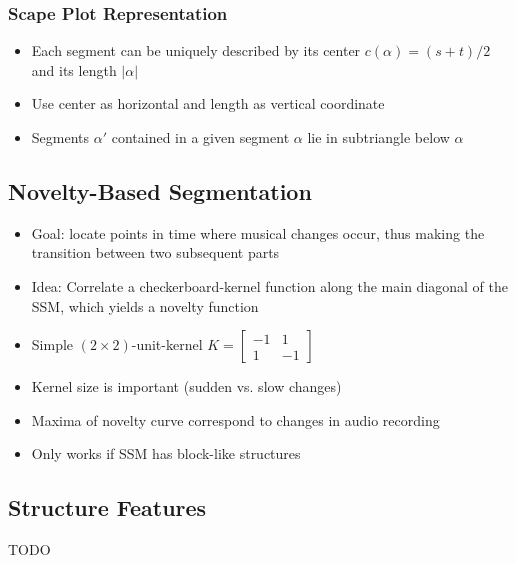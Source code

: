 \documentclass{scrartcl}
\begin{document}
\subsubsection*{Scape Plot Representation}
\begin{itemize}
    \item
        Each segment can be uniquely described by its center $c(\alpha) = (s+t)/2$ and its length $|\alpha|$
    \item
        Use center as horizontal and length as vertical coordinate
    \item
        Segments $\alpha'$ contained in a given segment $\alpha$ lie in subtriangle below $\alpha$
\end{itemize}

\subsection{Novelty-Based Segmentation}
\begin{itemize}
    \item
        Goal: locate points in time where musical changes occur, thus making the transition between two subsequent parts
    \item
        Idea: Correlate a checkerboard-kernel function along the main diagonal of the SSM, which yields a novelty function
    \item
        Simple $(2 \times 2)$-unit-kernel $K = \begin{bmatrix} -1 & 1 \\ 1 & -1 \end{bmatrix}$
    \item
        Kernel size is important (sudden vs. slow changes)
    \item
        Maxima of novelty curve correspond to changes in audio recording
    \item
        Only works if SSM has block-like structures
\end{itemize}

\subsection{Structure Features}
TODO
\end{document}
